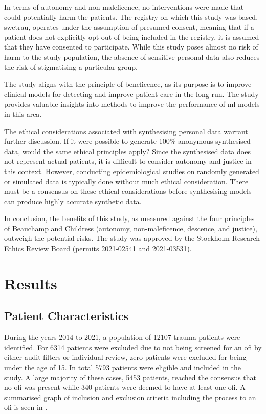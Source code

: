 \documentclass[12pt, a4paper]{article}
\begin{document}
In terms of autonomy and non-maleficence, no interventions were made that could potentially harm the patients. The registry on which this study was based, \acrshort{swetrau}, operates under the assumption of presumed consent, meaning that if a patient does not explicitly opt out of being included in the registry, it is assumed that they have consented to participate. While this study poses almost no risk of harm to the study population, the absence of sensitive personal data also reduces the risk of stigmatising a particular group.

The study aligns with the principle of beneficence, as its purpose is to improve clinical models for detecting  and improve patient care in the long run. The study provides valuable insights into methods to improve the performance of \acrshort{ml} models in this area.

The ethical considerations associated with synthesising personal data warrant further discussion. If it were possible to generate 100\% anonymous synthesised data, would the same ethical principles apply? Since the synthesised data does not represent actual patients, it is difficult to consider autonomy and justice in this context. However, conducting epidemiological studies on randomly generated or simulated data is typically done without much ethical consideration. There must be a consensus on these ethical considerations before synthesising models can produce highly accurate synthetic data.

In conclusion, the benefits of this study, as measured against the four principles of Beauchamp and Childress (autonomy, non-maleficence, descence, and justice), outweigh the potential risks. The study was approved by the Stockholm Research Ethics Review Board (permits 2021-02541 and 2021-03531).

\section{Results}
\subsection{Patient Characteristics}

During the years 2014 to 2021, a population of \num{12107} trauma patients were identified. For \num{6314} patients were excluded due to not being screened for an \acrshort{ofi} by either audit filters or individual review, zero patients were excluded for being under the age of 15. In total \num{5793} patients were eligible and included in the study. A large majority of these cases, \num{5453} patients, reached the consensus that no \acrshort{ofi} was present while \num{340} patients were deemed to have at least one \acrshort{ofi}. A summarised graph of inclusion and exclusion criteria including the process to an \acrshort{ofi} is seen in .
\end{document}
